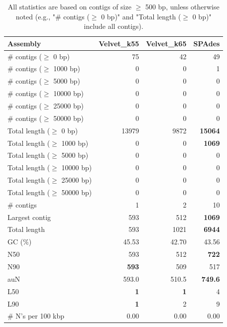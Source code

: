 \documentclass[12pt,a4paper]{article}
\begin{document}
\begin{table}[ht]
\begin{center}
\caption{All statistics are based on contigs of size $\geq$ 500 bp, unless otherwise noted (e.g., "\# contigs ($\geq$ 0 bp)" and "Total length ($\geq$ 0 bp)" include all contigs).}
\begin{tabular}{|l*{3}{|r}|}
\hline
Assembly & Velvet\_k55 & Velvet\_k65 & SPAdes \\ \hline
\# contigs ($\geq$ 0 bp) & 75 & 42 & 49 \\ \hline
\# contigs ($\geq$ 1000 bp) & 0 & 0 & 1 \\ \hline
\# contigs ($\geq$ 5000 bp) & 0 & 0 & 0 \\ \hline
\# contigs ($\geq$ 10000 bp) & 0 & 0 & 0 \\ \hline
\# contigs ($\geq$ 25000 bp) & 0 & 0 & 0 \\ \hline
\# contigs ($\geq$ 50000 bp) & 0 & 0 & 0 \\ \hline
Total length ($\geq$ 0 bp) & 13979 & 9872 & {\bf 15064} \\ \hline
Total length ($\geq$ 1000 bp) & 0 & 0 & {\bf 1069} \\ \hline
Total length ($\geq$ 5000 bp) & 0 & 0 & 0 \\ \hline
Total length ($\geq$ 10000 bp) & 0 & 0 & 0 \\ \hline
Total length ($\geq$ 25000 bp) & 0 & 0 & 0 \\ \hline
Total length ($\geq$ 50000 bp) & 0 & 0 & 0 \\ \hline
\# contigs & 1 & 2 & 10 \\ \hline
Largest contig & 593 & 512 & {\bf 1069} \\ \hline
Total length & 593 & 1021 & {\bf 6944} \\ \hline
GC (\%) & 45.53 & 42.70 & 43.56 \\ \hline
N50 & 593 & 512 & {\bf 722} \\ \hline
N90 & {\bf 593} & 509 & 517 \\ \hline
auN & 593.0 & 510.5 & {\bf 749.6} \\ \hline
L50 & {\bf 1} & {\bf 1} & 4 \\ \hline
L90 & {\bf 1} & 2 & 9 \\ \hline
\# N's per 100 kbp & 0.00 & 0.00 & 0.00 \\ \hline
\end{tabular}
\end{center}
\end{table}
\end{document}
